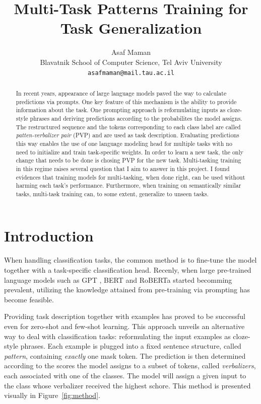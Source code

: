 \documentclass[11pt,a4paper]{article}
\title{Multi-Task Patterns Training for Task Generalization}
\author{Asaf Maman \\
  Blavatnik School of Computer Science, Tel Aviv University \\
  \texttt{asafmaman@mail.tau.ac.il} \\}
\date{}
\begin{document}
\maketitle

\begin{abstract}
In recent years, appearance of large language models paved the way to calculate predictions via prompts.
One key feature of this mechanism is the ability to provide information about the task.
One prompting approach is reformulating inputs as cloze-style phrases and deriving predictions according to the probabilites the model assigns.
The restructured sequence and the tokens corresponding to each class label are called \textit{patten-verbalizer pair} (PVP) and are used as task description.
Evaluating predictions this way enables the use of one language modeling head for multiple tasks with no need to initialize and train task-specific weights.
In order to learn a new task, the only change that needs to be done is chosing PVP for the new task. 
Multi-tasking training in this regime raises several question that I aim to answer in this project.
I found evidences that training models for multi-tasking, when done right, can be used without harming each task's performance.
Furthermore, when training on semantically similar tasks, multi-task training can, to some extent, generalize to unseen tasks.
\end{abstract}


\section{Introduction}

When handling classification tasks, the common method is to fine-tune the model together with a task-specific classification head.
Recenly, when large pre-trained language models such as GPT \citep{radford2018improving}, BERT \citep{devlin2019bert} and RoBERTa \citep{liu2019roberta} started becomming prevalent, utilizing the knowledge attained from pre-training via prompting has become feasible.

Providing task description together with examples has proved to be successful \citep{radford2019language} even for zero-shot and few-shot learning.
This approach unveils an alternative way to deal with classification tasks: reformulating the input examples as cloze-style phrases.
Each example is plugged into a fixed sentence structure, called \textit{pattern}, containing \textit{exactly} one mask token.
The prediction is then determined according to the scores the model assigns to a subset of tokens, called \textit{verbalizers}, each associated with one of the classes.
The model will assign a given input to the class whose verbalizer received the highest schore.
This method is presented visually in Figure~\ref{fig:method}.
\end{document}

